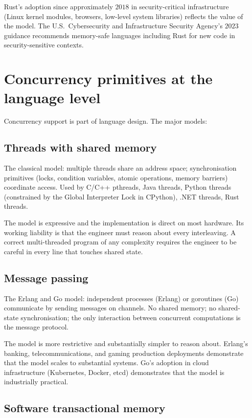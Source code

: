 Rust's adoption since approximately $2018$ in security-critical infrastructure (Linux kernel modules, browsers, low-level system libraries) reflects the value of the model. The U.S.\ Cybersecurity and Infrastructure Security Agency's $2023$ guidance recommends memory-safe languages including Rust for new code in security-sensitive contexts.

\section{Concurrency primitives at the language level}

Concurrency support is part of language design. The major models:

\subsection{Threads with shared memory}

The classical model: multiple threads share an address space; synchronisation primitives (locks, condition variables, atomic operations, memory barriers) coordinate access. Used by C/C++ pthreads, Java threads, Python threads (constrained by the Global Interpreter Lock in CPython), .NET threads, Rust threads.

The model is expressive and the implementation is direct on most hardware. Its working liability is that the engineer must reason about every interleaving. A correct multi-threaded program of any complexity requires the engineer to be careful in every line that touches shared state.

\subsection{Message passing}

The Erlang and Go model: independent processes (Erlang) or goroutines (Go) communicate by sending messages on channels. No shared memory; no shared-state synchronisation; the only interaction between concurrent computations is the message protocol.

The model is more restrictive and substantially simpler to reason about. Erlang's banking, telecommunications, and gaming production deployments demonstrate that the model scales to substantial systems. Go's adoption in cloud infrastructure (Kubernetes, Docker, etcd) demonstrates that the model is industrially practical.

\subsection{Software transactional memory}

